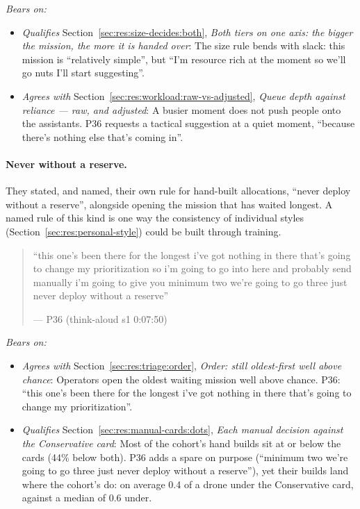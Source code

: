 \noindent\textit{Bears on:}
\begin{itemize}[leftmargin=1.2em,itemsep=1pt]\small
\item \textit{Qualifies} Section~\ref{sec:res:size-decides:both}, \emph{Both tiers on one axis: the bigger the mission, the more it is handed over}: The size rule bends with slack: this mission is ``relatively simple'', but ``I'm resource rich at the moment so we'll go nuts I'll start suggesting''.
\item \textit{Agrees with} Section~\ref{sec:res:workload:raw-vs-adjusted}, \emph{Queue depth against reliance --- raw, and adjusted}: A busier moment does not push people onto the assistants. P36 requests a tactical suggestion at a quiet moment, ``because there's nothing else that's coming in''.
\end{itemize}


\label{sec:qual:practitioner:pt-reserve}\paragraph{Never without a reserve.}
They stated, and named, their own rule for hand-built allocations, ``never deploy without a reserve'', alongside opening the mission that has waited longest. A named rule of this kind is one way the consistency of individual styles (Section~\ref{sec:res:personal-style}) could be built through training.

\begin{quote}\small
``this one's been there for the longest i've got nothing in there that's going to change my prioritization so i'm going to go into here and probably send manually i'm going to give you minimum two we're going to go three just never deploy without a reserve''\par\hfill--- P36 (think-aloud s1 0:07:50)
\end{quote}

\noindent\textit{Bears on:}
\begin{itemize}[leftmargin=1.2em,itemsep=1pt]\small
\item \textit{Agrees with} Section~\ref{sec:res:triage:order}, \emph{Order: still oldest-first well above chance}: Operators open the oldest waiting mission well above chance. P36: ``this one's been there for the longest i've got nothing in there that's going to change my prioritization''.
\item \textit{Qualifies} Section~\ref{sec:res:manual-cards:dots}, \emph{Each manual decision against the Conservative card}: Most of the cohort's hand builds sit at or below the cards (44\% below both). P36 adds a spare on purpose (``minimum two we're going to go three just never deploy without a reserve''), yet their builds land where the cohort's do: on average 0.4 of a drone under the Conservative card, against a median of 0.6 under.
\end{itemize}


